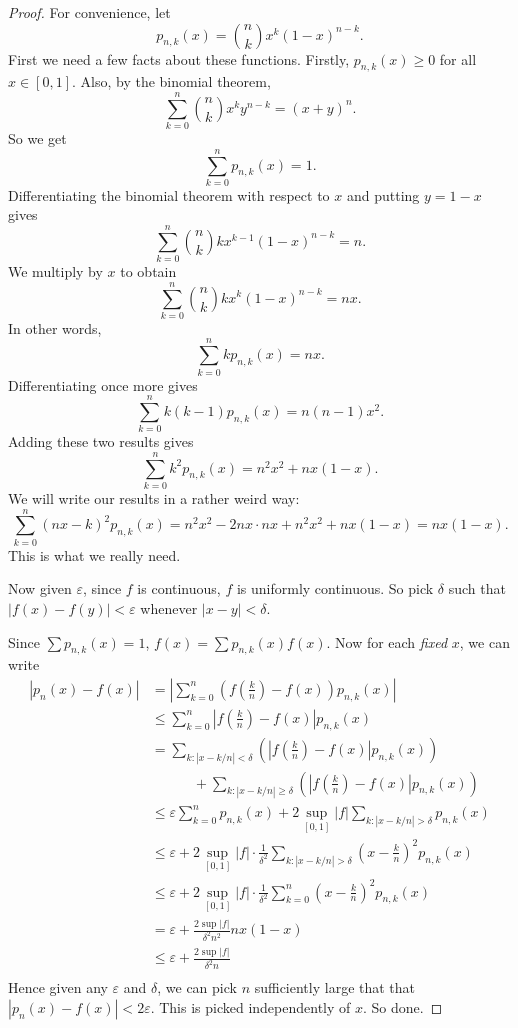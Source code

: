 \documentclass[a4paper]{article}
\begin{document}
\begin{proof}
  For convenience, let
  \[
    p_{n, k}(x) = \binom{n}{k}x^k (1 - x)^{n - k}.
  \]
  First we need a few facts about these functions. Firstly, $p_{n, k}(x) \geq 0$ for all $x\in [0, 1]$. Also, by the binomial theorem,
  \[
    \sum_{k = 0}^n \binom{n}{k}x^k y^{n - k} = (x + y)^n.
  \]
  So we get
  \[
    \sum_{k = 0}^n p_{n, k}(x) = 1.
  \]
  Differentiating the binomial theorem with respect to $x$ and putting $y = 1 - x$ gives
  \[
    \sum_{k = 0}^n \binom{n}{k}k x^{k - 1}(1 - x)^{n - k} = n.
  \]
  We multiply by $x$ to obtain
  \[
    \sum_{k = 0}^n \binom{n}{k}k x^k(1 - x)^{n - k} = nx.
  \]
  In other words,
  \[
    \sum_{k = 0}^n kp_{n, k}(x) = nx.
  \]
  Differentiating once more gives
  \[
    \sum_{k = 0}^n k(k - 1)p_{n, k}(x) = n(n - 1)x^2.
  \]
  Adding these two results gives
  \[
    \sum_{k = 0}^n k^2 p_{n, k}(x) = n^2 x^2 + nx(1 - x).
  \]
  We will write our results in a rather weird way:
  \[
    \sum_{k = 0}^n (nx - k)^2 p_{n, k}(x) = n^2 x^2 - 2nx \cdot nx + n^2 x^2 + nx(1 - x) = nx(1 - x).\tag{$*$}
  \]
  This is what we really need.

  Now given $\varepsilon$, since $f$ is continuous, $f$ is uniformly continuous. So pick $\delta$ such that $|f(x) - f(y)| < \varepsilon$ whenever $|x - y| < \delta$.

  Since $\sum p_{n, k}(x) = 1$, $f(x) = \sum p_{n, k}(x) f(x)$. Now for each \emph{fixed} $x$, we can write
  \begin{align*}
    |p_n(x) - f(x)| &= \left|\sum_{k = 0}^n \left(f\left(\frac{k}{n}\right) - f(x)\right) p_{n, k}(x)\right|\\
    &\leq \sum_{k = 0}^n \left|f\left(\frac{k}{n}\right) - f(x)\right| p_{n, k}(x)\\
    &= \sum_{k: |x - k/n| < \delta}\left(\left|f\left(\frac{k}{n}\right) - f(x)\right| p_{n, k}(x)\right) \\
    &\quad\quad\quad+ \sum_{k: |x - k/n| \geq \delta}\left(\left|f\left(\frac{k}{n}\right) - f(x)\right| p_{n, k}(x)\right)\\
    &\leq \varepsilon \sum_{k = 0}^n p_{n, k}(x) + 2\sup_{[0, 1]} |f| \sum_{k: |x - k/n| > \delta} p_{n, k}(x)\\
    &\leq \varepsilon + 2\sup_{[0, 1]} |f|\cdot \frac{1}{\delta^2}\sum_{k: |x - k/n| > \delta} \left(x - \frac{k}{n}\right)^2 p_{n, k}(x)\\
    &\leq \varepsilon + 2\sup_{[0, 1]} |f|\cdot \frac{1}{\delta^2}\sum_{k = 0}^n \left(x - \frac{k}{n}\right)^2 p_{n, k}(x)\\
    &= \varepsilon + \frac{2\sup|f|}{\delta^2 n^2} nx(1 - x)\\
    &\leq \varepsilon + \frac{2\sup|f|}{\delta^2 n}\\
  \end{align*}
  Hence given any $\varepsilon$ and $\delta$, we can pick $n$ sufficiently large that that $|p_n(x) - f(x)| < 2\varepsilon$. This is picked independently of $x$. So done.
\end{proof}
\end{document}
